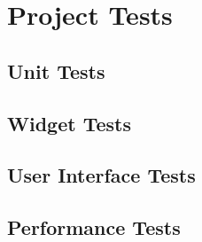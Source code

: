 \chapter{Project Tests}
\section{Unit Tests}
\section{Widget Tests}
\section{User Interface Tests}
\section{Performance Tests}
